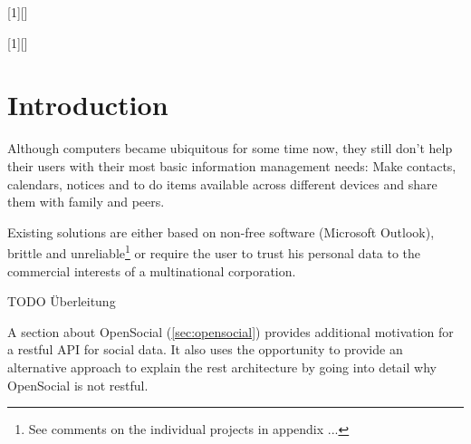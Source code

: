 \documentclass[12pt,a4paper]{scrartcl}		%
\newcommand{\citeurl}[2]{\url{#1} (#2)}
\begin{document}
[1][]
  {\lstset{language=Java,float=tb,#1}}%
  {} %

[1][]
  {\lstset{float=tb,#1}}%
  {} %

\lstset{ %
  language=Java,
  float=tb,
  frame=single,
  captionpos=b
}

\title{}
\subtitle{}
\author{Thomas Koch\\\url{thomas@koch.ro}\\matriculation number 7250371}
\publishers{Fernuniversität Hagen\\Faculty of mathematics and computer science}
\date{\today}
\maketitle{}

\tableofcontents{}
\begin{abstract}

\end{abstract}
\newpage{}

\section{Introduction}

Although computers became ubiquitous for some time now, they still don't help
their users with their most basic information management needs: Make contacts,
calendars, notices and to do items available across different devices and share
them with family and peers.

Existing solutions are either based on non-free software (Microsoft Outlook),
brittle and unreliable\footnote{See comments on the individual projects in
  appendix ...} or require the user to trust his personal data to the commercial
interests of a multinational corporation.

TODO Überleitung

A section about OpenSocial (\autoref{sec:opensocial}) provides additional
motivation for a restful API for social data. It also uses the opportunity to
provide an alternative approach to explain the rest architecture by going into
detail why OpenSocial is not restful.
\end{document}
